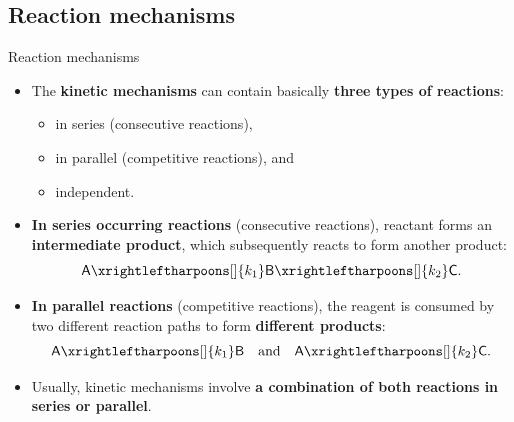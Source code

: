 \subsection{Reaction mechanisms}
%
%
\begin{frame}{Reaction mechanisms}
	\small
	\begin{itemize}
		\item The \alert{\bf kinetic mechanisms} can contain basically {\bf three types of reactions}:
		\begin{itemize}
			\item in series (consecutive reactions), 
			\item in parallel (competitive reactions), and 
			\item independent.
		\end{itemize}
		\pause
		\item \alert{\bf In series occurring reactions} (consecutive reactions), reactant forms an {\bf intermediate product}, which subsequently reacts to form another product:
		\[\mathsf{A} \xrightleftharpoons[]{k_1} \mathsf{B} \xrightleftharpoons[]{k_2} \mathsf{C}. \]
		\pause
		\item \alert{\bf In parallel reactions} (competitive reactions), the reagent is consumed by two different reaction paths to form {\bf different products}:
		\[\mathsf{A} \xrightleftharpoons[]{k_1} \mathsf{B} \quad \mbox{and}\quad \mathsf{A} \xrightleftharpoons[]{k_2} \mathsf{C}. \]
		\pause
		\item Usually, kinetic mechanisms involve {\bf a combination of both reactions in series or parallel}.
	\end{itemize}
\end{frame}
%
%
